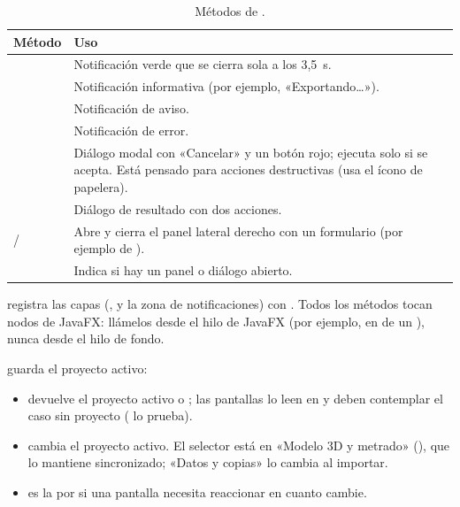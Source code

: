 \begin{table}[H]
	\centering
	\caption{Métodos de .}
	\label{tab:amp-notificador}
	\begin{tabular}{L{6.4cm}L{8.4cm}}
		\hline
		\textbf{Método} & \textbf{Uso} \\ \hline
		 & Notificación verde que se cierra sola a los 3,5~s. \\
		 & Notificación informativa (por ejemplo, «Exportando\ldots»). \\
		 & Notificación de aviso. \\
		 & Notificación de error. \\
		 & Diálogo modal con «Cancelar» y un
		botón rojo; ejecuta  solo si se acepta. Está pensado para acciones destructivas (usa el ícono
		de papelera). \\
		 & Diálogo de resultado con dos acciones. \\
		 /  & Abre y cierra el panel lateral
		derecho con un formulario (por ejemplo  de ). \\
		 & Indica si hay un panel o diálogo abierto. \\ \hline
	\end{tabular}
\end{table}

 registra las capas (,  y la zona de
notificaciones) con . Todos los métodos tocan nodos de JavaFX: llámelos desde el hilo de
JavaFX (por ejemplo, en  de un ), nunca desde el hilo de fondo.

 guarda el proyecto activo:

\begin{itemize}
	\item {} devuelve el proyecto activo o ; las pantallas lo leen en  y
	      deben contemplar el caso sin proyecto ( lo prueba).
	\item {} cambia el proyecto activo. El selector está en «Modelo 3D y metrado»
	      (), que lo mantiene sincronizado; «Datos y copias» lo cambia al importar.
	\item {} es la  por si una pantalla necesita reaccionar en
	      cuanto cambie.
\end{itemize}

